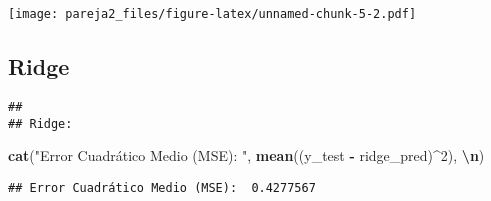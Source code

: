 \documentclass[
]{article}
\newenvironment{Shaded}{\begin{snugshade}}{\end{snugshade}}
\newcommand{\AttributeTok}[1]{\textcolor[rgb]{0.13,0.29,0.53}{#1}}
\newcommand{\DecValTok}[1]{\textcolor[rgb]{0.00,0.00,0.81}{#1}}
\newcommand{\FunctionTok}[1]{\textcolor[rgb]{0.13,0.29,0.53}{\textbf{#1}}}
\newcommand{\NormalTok}[1]{#1}
\newcommand{\OtherTok}[1]{\textcolor[rgb]{0.56,0.35,0.01}{#1}}
\newcommand{\SpecialCharTok}[1]{\textcolor[rgb]{0.81,0.36,0.00}{\textbf{#1}}}
\newcommand{\StringTok}[1]{\textcolor[rgb]{0.31,0.60,0.02}{#1}}
\begin{document}
\texttt{[image: pareja2\_files/figure-latex/unnamed-chunk-5-2.pdf]}

\hypertarget{ridge}{%
\subsection{Ridge}\label{ridge}}

\begin{Shaded}
\end{Shaded}

\begin{verbatim}
## 
## Ridge:
\end{verbatim}

\begin{Shaded}
\begin{Highlighting}[]
\FunctionTok{cat}\NormalTok{(}\StringTok{"Error Cuadrático Medio (MSE): "}\NormalTok{, }\FunctionTok{mean}\NormalTok{((y\_test }\SpecialCharTok{{-}}\NormalTok{ ridge\_pred)}\SpecialCharTok{\^{}}\DecValTok{2}\NormalTok{), }\StringTok{\textquotesingle{}}\SpecialCharTok{\textbackslash{}n}\StringTok{\textquotesingle{}}\NormalTok{)}
\end{Highlighting}
\end{Shaded}

\begin{verbatim}
## Error Cuadrático Medio (MSE):  0.4277567
\end{verbatim}
\end{document}
